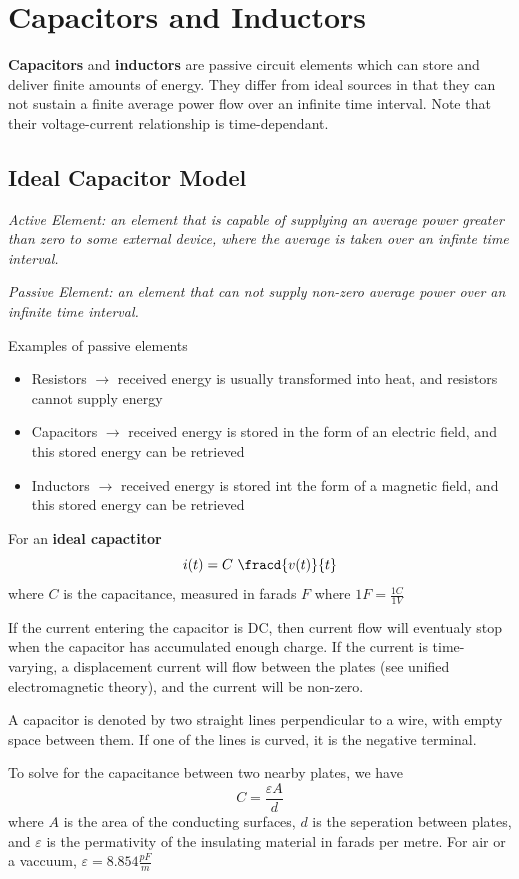 \documentclass[12pt]{article}
\begin{document}
\section*{Capacitors and Inductors}
{\bf Capacitors} and {\bf inductors} are passive circuit elements which can store and deliver finite amounts of energy. They differ from ideal sources in that they can not sustain a finite average power flow over an infinite time interval. Note that their voltage-current relationship is time-dependant.

\subsection*{Ideal Capacitor Model}
\textit{Active Element: an element that is capable of supplying an average power greater than zero to some external device, where the average is taken over an infinte time interval.}

\textit{Passive Element: an element that can not supply non-zero average power over an infinite time interval.}

Examples of passive elements
\begin{itemize}
\item Resistors $\to$ received energy is usually transformed into heat, and resistors cannot supply energy
\item Capacitors $\to$ received energy is stored in the form of an electric field, and this stored energy can be retrieved
\item Inductors $\to$ received energy is stored int the form of a magnetic field, and this stored energy can be retrieved
\end{itemize}

For an {\bf ideal capactitor} \[ i(t) = C\ \fracd{v(t)}{t} \] where $C$ is the capacitance, measured in farads $F$ where $1F = \frac{1C}{1V}$

If the current entering the capacitor is DC, then current flow will eventualy stop when the capacitor has accumulated enough charge. If the current is time-varying, a displacement current will flow between the plates (see unified electromagnetic theory), and the current will be non-zero.

A capacitor is denoted by two straight lines perpendicular to a wire, with empty space between them. If one of the lines is curved, it is the negative terminal.

To solve for the capacitance between two nearby plates, we have \[ C = \frac{\varepsilon A}{d} \] where $A$ is the area of the conducting surfaces, $d$ is the seperation between plates, and $\varepsilon$ is the permativity of the insulating material in farads per metre. For air or a vaccuum, $\varepsilon = 8.854 \frac{pF}{m}$
\end{document}

